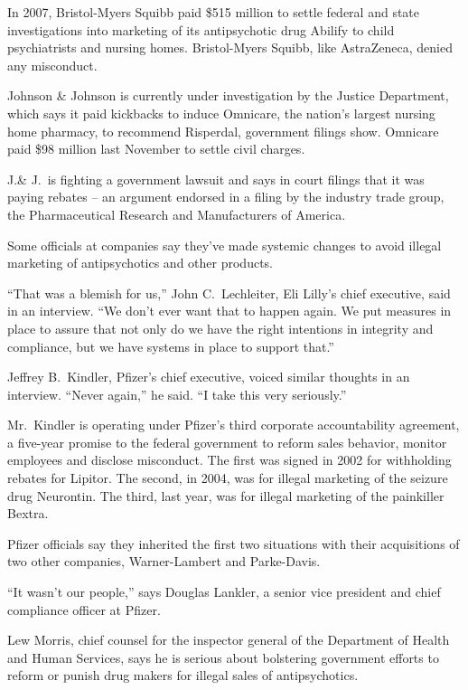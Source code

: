 ﻿\documentclass[12pt]{article}
\begin{document}
In 2007, Bristol-Myers Squibb paid \$515 million to settle federal and state investigations into
marketing of its antipsychotic drug Abilify to child psychiatrists and nursing homes. Bristol-Myers
Squibb, like AstraZeneca, denied any misconduct.

Johnson \& Johnson is currently under investigation by the Justice Department, which says it paid
kickbacks to induce Omnicare, the nation's largest nursing home pharmacy, to recommend Risperdal,
government filings show. Omnicare paid \$98 million last November to settle civil charges.

J.\& J.~is fighting a government lawsuit and says in court filings that it was paying rebates -- an
argument endorsed in a filing by the industry trade group, the Pharmaceutical Research and
Manufacturers of America.

Some officials at companies say they've made systemic changes to avoid illegal marketing of
antipsychotics and other products.

``That was a blemish for us,'' John C.~Lechleiter, Eli Lilly's chief executive, said in an
interview. ``We don't ever want that to happen again. We put measures in place to assure that not
only do we have the right intentions in integrity and compliance, but we have systems in place to
support that.''

Jeffrey B.~Kindler, Pfizer's chief executive, voiced similar thoughts in an interview. ``Never
again,'' he said. ``I take this very seriously.''

Mr.~Kindler is operating under Pfizer's third corporate accountability agreement, a five-year
promise to the federal government to reform sales behavior, monitor employees and disclose
misconduct. The first was signed in 2002 for withholding rebates for Lipitor. The second, in 2004,
was for illegal marketing of the seizure drug Neurontin. The third, last year, was for illegal
marketing of the painkiller Bextra.

Pfizer officials say they inherited the first two situations with their acquisitions of two other
companies, Warner-Lambert and Parke-Davis.

``It wasn't our people,'' says Douglas Lankler, a senior vice president and chief compliance officer
at Pfizer.

Lew Morris, chief counsel for the inspector general of the Department of Health and Human Services,
says he is serious about bolstering government efforts to reform or punish drug makers for illegal
sales of antipsychotics.
\end{document}
